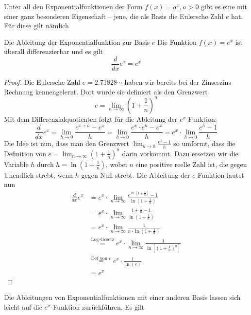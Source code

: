 \clearpage
Unter all den Exponentialfunktionen der Form $f(x)=a^x,a>0$ gibt es eine mit einer ganz besonderen Eigenschaft – jene, die als Basis die Eulersche Zahl $e$ hat. Für diese gilt nämlich

\begin{satz}
	{Die Ableitung der Exponentialfunktion zur Basis $e$}{}
	Die Funktion $f(x)=e^x$ ist überall differenzierbar und es gilt
	$$
		\frac{d}{dx} e^x = e^x
	$$
\end{satz}

\begin{proof}
	Die Eulersche Zahl $e=2.71828\cdots$ haben wir bereits bei der Zinseszins-Rechnung kennengelernt. Dort wurde sie definiert als den Grenzwert
	$$
		e= \lim_{n\rightarrow\infty} \left(1+\frac{1}{n}\right)^n
	$$
	Mit dem Differenzialquotienten folgt für die Ableitung der $e^x$-Funktion:
	$$
		\frac{d}{dx} e^x = \lim_{h\rightarrow0} \frac{e^{x+h}-e^x}{h} =  \lim_{h\rightarrow0} \frac{e^{x}\cdot e^h -e^x}{h} = e^x \cdot \lim_{h\rightarrow0} \frac{ e^h - 1}{h}
	$$
	Die Idee ist nun, dass man den Grenzwert $\lim_{h\rightarrow0} \frac{ e^h - 1}{h}$ so umformt, dass die Definition von $e= \lim_{n\rightarrow\infty} \left(1+\frac{1}{n}\right)^n$ darin vorkommt. Dazu ersetzen wir die Variable $h$ durch $h=\ln\left(1+\frac{1}{n}\right) $, wobei $n$ eine positive reelle Zahl ist, die gegen Unendlich strebt, wenn $h$ gegen Null strebt. Die Ableitung der $e$-Funktion lautet nun
	\begin{align*}
		\frac{d}{dx} e^x & =  e^x \cdot \lim_{n\rightarrow\infty} \frac{ e^{\ln\left(1+\frac{1}{n}\right)} - 1}{\ln\left(1+\frac{1}{n}\right)}        \\
		                 & = e^x \cdot \lim_{n\rightarrow\infty} \frac{1+\frac{1}{n}-1}{\ln\left(1+\frac{1}{n}\right)}                                \\
		                 & = e^x \cdot \lim_{n\rightarrow\infty} \frac{1}{n\cdot \ln\left(1+\frac{1}{n}\right)}                                       \\
		                 & \stackrel{\text{Log-Gesetz}}{=} e^x \cdot \lim_{n\rightarrow\infty} \frac{1}{\ln\left[\left(1+\frac{1}{n}\right)^n\right]} \\
		                 & \stackrel{\text{Def von }e}{=}  e^x \cdot  \frac{1}{\ln(e)}                                                                \\
		                 & = e^x
	\end{align*}
\end{proof}
Die Ableitungen von Exponentialfunktionen mit einer anderen Basis lassen sich leicht auf die $e^x$-Funktion zurückführen. Es gilt
